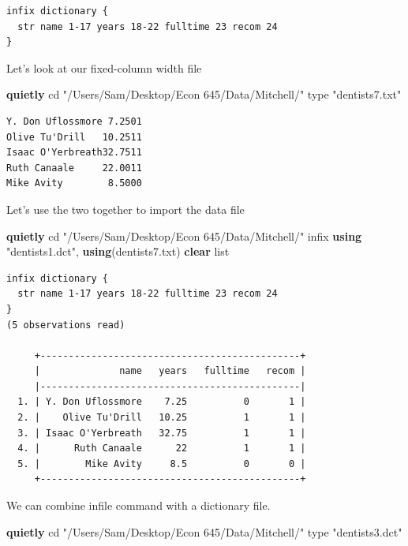 \documentclass[
]{book}
\newenvironment{Shaded}{\begin{snugshade}}{\end{snugshade}}
\newcommand{\DecValTok}[1]{\textcolor[rgb]{0.00,0.00,0.81}{#1}}
\newcommand{\KeywordTok}[1]{\textcolor[rgb]{0.13,0.29,0.53}{\textbf{#1}}}
\newcommand{\NormalTok}[1]{#1}
\newcommand{\OtherTok}[1]{\textcolor[rgb]{0.56,0.35,0.01}{#1}}
\newcommand{\StringTok}[1]{\textcolor[rgb]{0.31,0.60,0.02}{#1}}
\begin{document}
\begin{verbatim}
infix dictionary {
  str name 1-17 years 18-22 fulltime 23 recom 24
}
\end{verbatim}

Let's look at our fixed-column width file

\begin{Shaded}
\begin{Highlighting}[]
\KeywordTok{quietly}\NormalTok{ cd }\StringTok{"/Users/Sam/Desktop/Econ 645/Data/Mitchell/"}
\DecValTok{type} \StringTok{"dentists7.txt"}
\end{Highlighting}
\end{Shaded}

\begin{verbatim}
Y. Don Uflossmore 7.2501
Olive Tu'Drill   10.2511
Isaac O'Yerbreath32.7511
Ruth Canaale     22.0011
Mike Avity        8.5000
\end{verbatim}

Let's use the two together to import the data file

\begin{Shaded}
\begin{Highlighting}[]
\KeywordTok{quietly}\NormalTok{ cd }\StringTok{"/Users/Sam/Desktop/Econ 645/Data/Mitchell/"}
\NormalTok{infix }\KeywordTok{using} \StringTok{"dentists1.dct"}\NormalTok{, }\KeywordTok{using}\NormalTok{(dentists7.txt) }\KeywordTok{clear}
\OtherTok{list}
\end{Highlighting}
\end{Shaded}

\begin{verbatim}
infix dictionary {
  str name 1-17 years 18-22 fulltime 23 recom 24
}
(5 observations read)

     +----------------------------------------------+
     |              name   years   fulltime   recom |
     |----------------------------------------------|
  1. | Y. Don Uflossmore    7.25          0       1 |
  2. |    Olive Tu'Drill   10.25          1       1 |
  3. | Isaac O'Yerbreath   32.75          1       1 |
  4. |      Ruth Canaale      22          1       1 |
  5. |        Mike Avity     8.5          0       0 |
     +----------------------------------------------+
\end{verbatim}

We can combine infile command with a dictionary file.

\begin{Shaded}
\begin{Highlighting}[]
\KeywordTok{quietly}\NormalTok{ cd }\StringTok{"/Users/Sam/Desktop/Econ 645/Data/Mitchell/"}
\DecValTok{type} \StringTok{"dentists3.dct"}
\end{Highlighting}
\end{Shaded}
\end{document}
